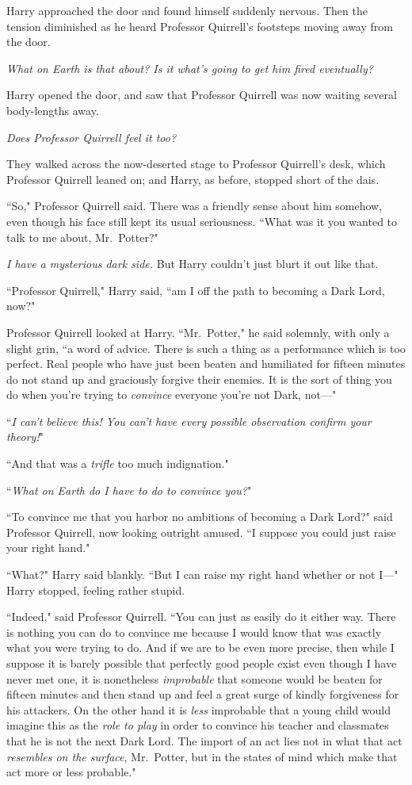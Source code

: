 Harry approached the door and found himself suddenly nervous. Then the tension diminished as he heard Professor Quirrell's footsteps moving away from the door.

\emph{What on Earth is that about? Is it what's going to get him fired eventually?}

Harry opened the door, and saw that Professor Quirrell was now waiting several body-lengths away.

\emph{Does Professor Quirrell feel it too?}

They walked across the now-deserted stage to Professor Quirrell's desk, which Professor Quirrell leaned on; and Harry, as before, stopped short of the dais.

``So," Professor Quirrell said. There was a friendly sense about him somehow, even though his face still kept its usual seriousness. ``What was it you wanted to talk to me about, Mr.~Potter?"

\emph{I have a mysterious dark side.} But Harry couldn't just blurt it out like that.

``Professor Quirrell," Harry said, ``am I off the path to becoming a Dark Lord, now?"

Professor Quirrell looked at Harry. ``Mr.~Potter," he said solemnly, with only a slight grin, ``a word of advice. There is such a thing as a performance which is too perfect. Real people who have just been beaten and humiliated for fifteen minutes do not stand up and graciously forgive their enemies. It is the sort of thing you do when you're trying to \emph{convince} everyone you're not Dark, not—"

``\emph{I can't believe this! You can't have every possible observation confirm your theory!}"

``And that was a \emph{trifle} too much indignation."

``\emph{What on Earth do I have to do to convince you?}"

``To convince me that you harbor no ambitions of becoming a Dark Lord?" said Professor Quirrell, now looking outright amused. ``I suppose you could just raise your right hand."

``What?" Harry said blankly. ``But I can raise my right hand whether or not I—" Harry stopped, feeling rather stupid.

``Indeed," said Professor Quirrell. ``You can just as easily do it either way. There is nothing you can do to convince me because I would know that was exactly what you were trying to do. And if we are to be even more precise, then while I suppose it is barely possible that perfectly good people exist even though I have never met one, it is nonetheless \emph{improbable} that someone would be beaten for fifteen minutes and then stand up and feel a great surge of kindly forgiveness for his attackers. On the other hand it is \emph{less} improbable that a young child would imagine this as the \emph{role to play} in order to convince his teacher and classmates that he is not the next Dark Lord. The import of an act lies not in what that act \emph{resembles on the surface}, Mr.~Potter, but in the states of mind which make that act more or less probable."


